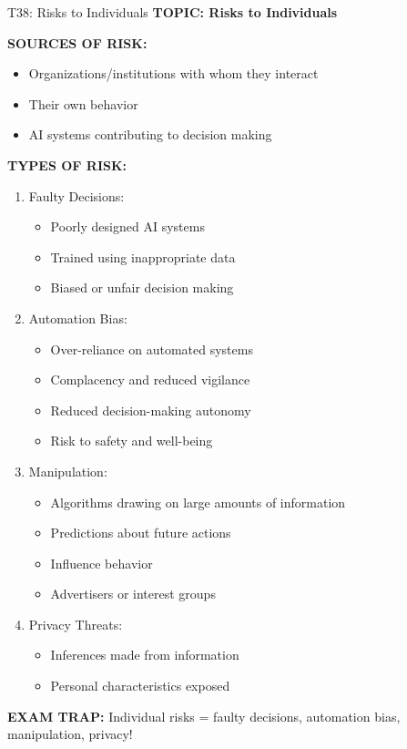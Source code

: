 \documentclass[8pt]{beamer}
\begin{document}
	\begin{frame}{T38: Risks to Individuals}
		\fontsize{6.5}{7.5}\selectfont
		\textbf{TOPIC: Risks to Individuals}
		
		\vspace{0.1cm}
		\textbf{SOURCES OF RISK:}
		\begin{itemize}
			\item Organizations/institutions with whom they interact
			\item Their own behavior
			\item AI systems contributing to decision making
		\end{itemize}
		
		\vspace{0.1cm}
		\textbf{TYPES OF RISK:}
		\begin{enumerate}
			\item \textcolor{myblue}{Faulty Decisions:}
			\begin{itemize}
				\item Poorly designed AI systems
				\item Trained using inappropriate data
				\item Biased or unfair decision making
			\end{itemize}
			\item \textcolor{myblue}{Automation Bias:}
			\begin{itemize}
				\item Over-reliance on automated systems
				\item Complacency and reduced vigilance
				\item Reduced decision-making autonomy
				\item Risk to safety and well-being
			\end{itemize}
			\item \textcolor{myblue}{Manipulation:}
			\begin{itemize}
				\item Algorithms drawing on large amounts of information
				\item Predictions about future actions
				\item Influence behavior
				\item Advertisers or interest groups
			\end{itemize}
			\item \textcolor{myblue}{Privacy Threats:}
			\begin{itemize}
				\item Inferences made from information
				\item Personal characteristics exposed
			\end{itemize}
		\end{enumerate}
		
		\textcolor{myred}{\textbf{EXAM TRAP:}} Individual risks = \textcolor{myblue}{faulty decisions, automation bias, manipulation, privacy}!
	\end{frame}
	
\end{document}
